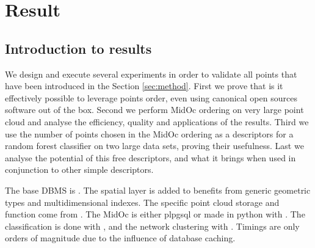 

 \section{ Result }
	 \label{sec:result}
 	\subsection{Introduction to results}
 		We design and execute several experiments in order to validate all points that have been introduced in the Section \ref{sec:method}.
 		First we prove that is it effectively possible to leverage points order, even using canonical open sources software out of the box.
 		Second we perform MidOc ordering on very large point cloud and analyse the efficiency, quality and applications of the results.
 		Third we use the number of points chosen in the MidOc ordering as a descriptors for a random forest classifier on two large data sets, proving their usefulness.
 		Last we analyse the potential of this free descriptors, and what it brings when used in conjunction to other simple descriptors.
 		
 		The base DBMS is \cite{PostgreSQL2014}. The spatial layer \cite{PostGIS2014} is added to benefits from generic geometric types and multidimensional indexes. The specific point cloud storage and function come from \cite{pgPointCloud2014}. 
 		The MidOc is either plpgsql or made in python with \cite{SciPy2014}. 
 		The classification is done with \cite{scikit-image}, and the network clustering with \cite{Networkx2014}.
 		Timings are only orders of magnitude due to the influence of database caching.
 	
	
